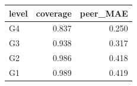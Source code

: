 \begin{tabular}{lrr}
\toprule
level & coverage & peer_MAE \\
\midrule
G4 & 0.837 & 0.250 \\
G3 & 0.938 & 0.317 \\
G2 & 0.986 & 0.418 \\
G1 & 0.989 & 0.419 \\
\bottomrule
\end{tabular}

